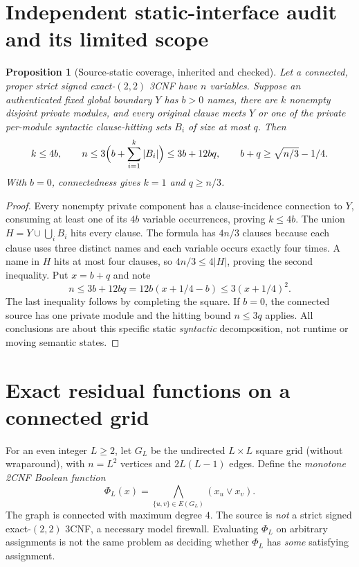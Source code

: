 \documentclass[11pt]{article}
\newtheorem{proposition}[theorem]{Proposition}
\begin{document}
\section{Independent static-interface audit and its limited scope}
\begin{proposition}[Source-static coverage, inherited and checked]\label{prop:static}
Let a connected, proper strict signed exact-$(2,2)$ 3CNF have $n$ variables. Suppose an authenticated fixed global boundary $Y$ has $b>0$ names, there are $k$ nonempty disjoint private modules, and every original clause meets $Y$ or one of the private per-module syntactic clause-hitting sets $B_i$ of size at most $q$. Then
\[
 k\le 4b,\qquad n\le 3\Bigl(b+\sum_{i=1}^k |B_i|\Bigr)\le3b+12bq,
 \qquad b+q\ge\sqrt{n/3}-1/4.
\]
With $b=0$, connectedness gives $k=1$ and $q\ge n/3$.
\end{proposition}
\begin{proof}
Every nonempty private component has a clause-incidence connection to $Y$, consuming at least one of its $4b$ variable occurrences, proving $k\le4b$. The union $H=Y\cup\bigcup_i B_i$ hits every clause. The formula has $4n/3$ clauses because each clause uses three distinct names and each variable occurs exactly four times. A name in $H$ hits at most four clauses, so $4n/3\le4|H|$, proving the second inequality. Put $x=b+q$ and note
\[
 n\le 3b+12bq=12b(x+1/4-b)\le3(x+1/4)^2.
\]
The last inequality follows by completing the square. If $b=0$, the connected source has one private module and the hitting bound $n\le3q$ applies. All conclusions are about this specific static \emph{syntactic} decomposition, not runtime or moving semantic states.
\end{proof}

\section{Exact residual functions on a connected grid}
\noindent For an even integer $L\ge2$, let $G_L$ be the undirected $L\times L$ square grid (without wraparound), with $n=L^2$ vertices and $2L(L-1)$ edges. Define the \emph{monotone 2CNF Boolean function}
\[
 \Phi_L(x)=\bigwedge_{\{u,v\}\in E(G_L)}(x_u\vee x_v).
\]
The graph is connected with maximum degree $4$. The source is \emph{not} a strict signed exact-$(2,2)$ 3CNF, a necessary model firewall. Evaluating $\Phi_L$ on arbitrary assignments is not the same problem as deciding whether $\Phi_L$ has \emph{some} satisfying assignment.
\end{document}
